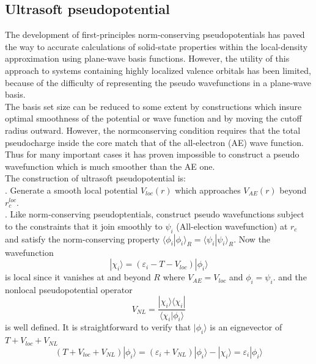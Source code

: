 \documentclass[UTF8]{ctexart}
\begin{document}
        \subsection{Ultrasoft pseudopotential}
            \indent The development of first-principles norm-conserving pseudopotentials has paved the way to accurate calculations of solid-state
            properties within the local-density approximation using plane-wave basis functions. However, the utility of this approach to systems containing
            highly localized valence orbitals has been limited, because of the difficulty of representing the pseudo wavefunctions in a plane-wave basis.\\
            The basis set size can be reduced to some extent by constructions which insure optimal smoothness of the potential or wave function and by
            moving the cutoff radius outward. However, the normconserving condition requires that the total pseudocharge inside the core match that of the
            all-electron (AE) wave function. Thus for many important cases it has proven impossible to construct a pseudo wavefunction which is much smoother than the AE one.\\
            The construction of ultrasoft pseudopotential is:\\
            . Generate a smooth local potential $V_{loc}(r)$ which approaches $V_{AE}(r)$ beyond $r_c^{loc}$.\\
            . Like norm-conserving pseudoptentials, construct pseudo wavefunctions subject to the constraints that it join smoothly to $\psi_i$ (All-election wavefunction)
            at $r_c$ and satisfy the norm-conserving property $\langle\phi_i|\phi_i\rangle_R=\langle\psi_i|\psi_i\rangle_R$. Now the wavefunction
            \begin{equation}
                |\chi_i\rangle=(\varepsilon_i-T-V_{loc})|\phi_i\rangle
            \end{equation}
            is local since it vanishes at and beyond $R$ where $V_{AE}=V_{loc}$ and $\phi_i=\psi_i$. and the nonlocal pseudopotential operator
            \begin{equation}
                V_{NL}=\dfrac{|\chi_i\rangle\langle\chi_i|}{\langle\chi_i|\phi_i\rangle}
            \end{equation}
            is well defined. It is straightforward to verify that $|\phi_i\rangle$ is an eignevector of $T+V_{loc}+V_{NL}$
            \begin{equation}
                (T+V_{loc}+V_{NL})|\phi_i\rangle=(\varepsilon_i+V_{NL})|\phi_i\rangle-|\chi_i\rangle=\varepsilon_i|\phi_i\rangle
            \end{equation}
\end{document}
